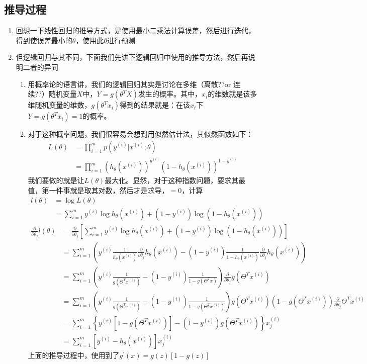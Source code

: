 \subsection{推导过程}
\begin{enumerate}
	\item 回想一下线性回归的推导方式，是使用最小二乘法计算误差，然后进行迭代，得到使误差最小的$\theta$，使用此$\theta$进行预测
	\item 但逻辑回归与其不同，下面我们先讲下逻辑回归中使用的推导方法，然后再说明二者的异同
	\begin{enumerate}
		\item 用概率论的语言讲，我们的逻辑回归其实是讨论在多维（离散??or 连续??）随机变量$X$中，$Y=g(\theta^TX)$发生的概率。其中，$x_i$的维数就是该多维随机变量的维数，$g(\theta^Tx_i)$得到的结果就是：在该$x_i$下$Y=g(\theta^Tx_i)=1$的概率。
		\item 对于这种概率问题，我们很容易会想到用似然估计法，其似然函数如下：
			\begin{align}
				L(\theta) &= \prod_{i=1}^{m}p(y^{(i)}|x^{(i)}; \theta) \\
				&= \prod_{i=1}^{m}\left( h_\theta(x^{(i)}) \right)^{y^{(i)}} \left( 1-h_\theta(x^{(i)}) \right)^{1-y^{(i)}}
			\end{align}
			我们要做的就是让$L(\theta)$最大化。显然，对于这种指数问题，要求其最值，第一件事就是取其对数，然后才是求导，$=0$，计算
			\begin{align}
				l(\theta) &= \log L(\theta) \\
				&= \sum_{i=1}^{m}y^{(i)}\log h_\theta(x^{(i)}) + (1-y^{(i)})\log(1-h_\theta(x^{(i)}))
			\end{align}
			\begin{align}
				\frac{\partial}{\partial \theta_j}l(\theta) &= \frac{\partial}{\partial \theta_j} \left[ \sum_{i=1}^{m}y^{(i)}\log h_\theta(x^{(i)}) + (1-y^{(i)})\log(1-h_\theta(x^{(i)})) \right]\\
				&= \sum_{i=1}^{m} \left( y^{(i)}\frac{1}{h_\theta(x^{(i)})} \frac{\partial}{\partial\theta_j}h_\theta(x^{(i)}) - (1-y^{(i)})\frac{1}{1-h_\theta(x^{(i)})}\frac{\partial}{\partial\theta_j}h_\theta(x^{(i)})  \right) \\
				&= \sum_{i=1}^{m} \left( y^{(i)}\frac{1}{g(\Theta^Tx^{(i)})} - (1-y^{(i)})\frac{1}{1-g(\Theta^Tx)} \right) \frac{\partial}{\partial\theta_j}g(\Theta^Tx^{(i)}) \\
				&= \sum_{i=1}^{m} \left( y^{(i)}\frac{1}{g(\Theta^Tx^{(i)})} - (1-y^{(i)})\frac{1}{1-g(\Theta^Tx^{(i)})} \right)g(\Theta^Tx^{(i)})(1-g(\Theta^Tx^{(i)})) \frac{\partial}{\partial\theta_j}\Theta^Tx^{(i)} \\
				&= \sum_{i=1}^{m} \left\{ y^{(i)}\left[1-g(\Theta^Tx^{(i)})\right] - (1-y^{(i)})g(\Theta^Tx^{(i)}) \right\}x_j^{(i)} \\
				&= \sum_{i=1}^{m} \left[ y^{(i)} - h_\theta(x^{(i)}) \right]x_j^{(i)}
			\end{align}
			上面的推导过程中，使用到了$g^{'}{(x)}=g(z)\left[1-g(z)\right]$


\end{enumerate}
\end{enumerate}

